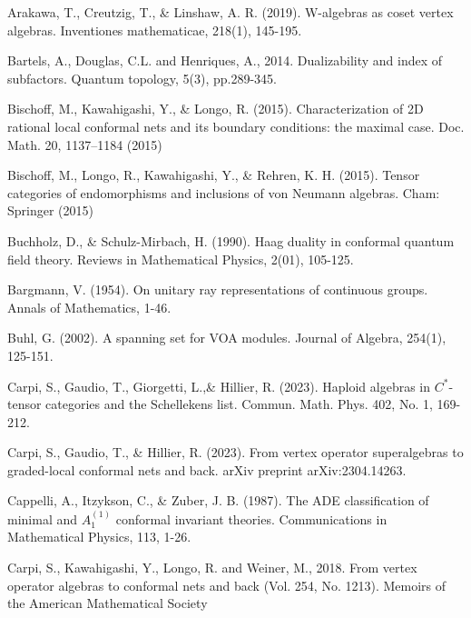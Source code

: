 \documentclass[11pt,b5paper,notitlepage]{article}
\theoremstyle{definition}
\theoremstyle{plain}
\numberwithin{equation}{section}
\begin{document}
	\begin{thebibliography}{999999}
		\footnotesize	


Arakawa, T., Creutzig, T., \& Linshaw, A. R. (2019). W-algebras as coset vertex algebras. Inventiones mathematicae, 218(1), 145-195.


Bartels, A., Douglas, C.L. and Henriques, A., 2014. Dualizability and index of subfactors. Quantum topology, 5(3), pp.289-345.

Bischoff, M., Kawahigashi, Y., \& Longo, R. (2015). Characterization of 2D rational local conformal nets and its boundary conditions: the maximal case. Doc. Math. 20, 1137--1184 (2015)

Bischoff, M., Longo, R., Kawahigashi, Y., \& Rehren, K. H. (2015). Tensor categories of endomorphisms and inclusions of von Neumann algebras. Cham: Springer (2015)

Buchholz, D., \& Schulz-Mirbach, H. (1990). Haag duality in conformal quantum field theory. Reviews in Mathematical Physics, 2(01), 105-125.

Bargmann, V. (1954). On unitary ray representations of continuous groups. Annals of Mathematics, 1-46.

Buhl, G. (2002). A spanning set for VOA modules. Journal of Algebra, 254(1), 125-151.

Carpi, S., Gaudio, T., Giorgetti, L.,\& Hillier, R. (2023). Haploid algebras in $C^*$-tensor categories and the Schellekens list. Commun. Math. Phys. 402, No. 1, 169-212.

Carpi, S., Gaudio, T., \& Hillier, R. (2023). From vertex operator superalgebras to graded-local conformal nets and back. arXiv preprint arXiv:2304.14263.

Cappelli, A., Itzykson, C., \& Zuber, J. B. (1987). The ADE classification of minimal and $A_1^{(1)}$ conformal invariant theories. Communications in Mathematical Physics, 113, 1-26.

Carpi, S., Kawahigashi, Y., Longo, R. and Weiner, M., 2018. From vertex operator algebras to conformal nets and back (Vol. 254, No. 1213). Memoirs of the American Mathematical Society


\end{thebibliography}
\end{document}
